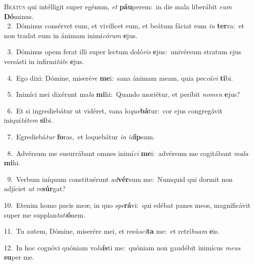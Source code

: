 \lettrine{\initial\textcolor{\initialcolor}{B}}{eátus} qui intélligit super egénum, \textit{et} \textbf{páu}\-perem:~\star in die mala liberábit \textit{e}\-\textit{um} \textbf{Dó}\-minus.\\
{\numbfont\textcolor{\numbcolor}{~2.}}~Dóminus consérvet eum, et vivíficet eum, et beátum fáciat eum \textit{in} \textbf{ter}\-ra:~\star et non tradat eum in ánimam inimi\-\textit{có}\-\textit{rum} \textbf{e}\-jus.\par
{\numbfont\textcolor{\numbcolor}{~3.}}~Dóminus opem ferat illi super lectum doló\textit{ris} \textbf{e}\-jus:~\star univérsum stratum ejus versásti in infirmi\-\textit{tá}\-\textit{te} \textbf{e}\-jus.\par
{\numbfont\textcolor{\numbcolor}{~4.}}~Ego dixi: Dómine, miseré\textit{re} \textbf{me}\-i:~\star sana ánimam meam, quia pec\-\textit{cá}\-\textit{vi} \textbf{ti}\-bi.\par
{\numbfont\textcolor{\numbcolor}{~5.}}~Inimíci mei dixérunt ma\textit{la} \textbf{mi}\-hi:~\star Quando moriétur, et períbit \textit{no}\-\textit{men} \textbf{e}\-jus?\par
{\numbfont\textcolor{\numbcolor}{~6.}}~Et si ingrediebátur ut vidéret, vana lo\-\textit{que}\-\textbf{bá}tur:~\star cor ejus congregávit iniqui\-\textit{tá}\-\textit{tem} \textbf{si}\-bi.\par
{\numbfont\textcolor{\numbcolor}{~7.}}~Egrediebá\textit{tur} \textbf{fo}\-ras,~\star et loquebátur \textit{in} \textit{id}\-\textbf{íp}sum.\par
{\numbfont\textcolor{\numbcolor}{~8.}}~Advérsum me susurrábant omnes inimí\textit{ci} \textbf{me}\-i:~\star advérsum me cogitábant \textit{ma}\-\textit{la} \textbf{mi}\-hi.\par
{\numbfont\textcolor{\numbcolor}{~9.}}~Verbum iníquum constituérunt \textit{ad}\-\textbf{vér}sum me:~\star Numquid qui dormit non adjíciet \textit{ut} \textit{re}\-\textbf{súr}gat?\par
{\numbfont\textcolor{\numbcolor}{10.}}~Etenim homo pacis meæ, in quo \textit{spe}\-\textbf{rá}vi:~\star qui edébat panes meos, magnificávit super me supplan\-\textit{ta}\-\textit{ti}\textbf{ó}nem.\par
{\numbfont\textcolor{\numbcolor}{11.}}~Tu autem, Dómine, miserére mei, et resú\-\textit{sci}\-\textbf{ta} me:~\star et retrí\-\textit{bu}\-\textit{am} \textbf{e}\-is.\par
{\numbfont\textcolor{\numbcolor}{12.}}~In hoc cognóvi quóniam vo\-\textit{lu}\-\textbf{ís}ti me:~\star quóniam non gaudébit inimícus \textit{me}\-\textit{us} \textbf{su}\-per me.\par
